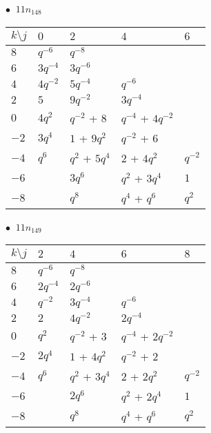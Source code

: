 \begin{minipage}{\linewidth}
$\bullet\ $ $11n_{148}$ \vspace{0.5em} \\
\begin{tabular}{l|llll}
$k \setminus j$ & $0$ & $2$ & $4$ & $6$ \\
\hline
$8$ & $q^{-6}$ & $q^{-8}$ &  &  \\
$6$ & $3q^{-4}$ & $3q^{-6}$ &  &  \\
$4$ & $4q^{-2}$ & $5q^{-4}$ & $q^{-6}$ &  \\
$2$ & $5$ & $9q^{-2}$ & $3q^{-4}$ &  \\
$0$ & $4q^{2}$ & $q^{-2}$ + $8$ & $q^{-4}$ + $4q^{-2}$ &  \\
$-2$ & $3q^{4}$ & $1$ + $9q^{2}$ & $q^{-2}$ + $6$ &  \\
$-4$ & $q^{6}$ & $q^{2}$ + $5q^{4}$ & $2$ + $4q^{2}$ & $q^{-2}$ \\
$-6$ &  & $3q^{6}$ & $q^{2}$ + $3q^{4}$ & $1$ \\
$-8$ &  & $q^{8}$ & $q^{4}$ + $q^{6}$ & $q^{2}$ \\
\end{tabular}
\vspace{2em}
\end{minipage}
%
\begin{minipage}{\linewidth}
$\bullet\ $ $11n_{149}$ \vspace{0.5em} \\
\begin{tabular}{l|llll}
$k \setminus j$ & $2$ & $4$ & $6$ & $8$ \\
\hline
$8$ & $q^{-6}$ & $q^{-8}$ &  &  \\
$6$ & $2q^{-4}$ & $2q^{-6}$ &  &  \\
$4$ & $q^{-2}$ & $3q^{-4}$ & $q^{-6}$ &  \\
$2$ & $2$ & $4q^{-2}$ & $2q^{-4}$ &  \\
$0$ & $q^{2}$ & $q^{-2}$ + $3$ & $q^{-4}$ + $2q^{-2}$ &  \\
$-2$ & $2q^{4}$ & $1$ + $4q^{2}$ & $q^{-2}$ + $2$ &  \\
$-4$ & $q^{6}$ & $q^{2}$ + $3q^{4}$ & $2$ + $2q^{2}$ & $q^{-2}$ \\
$-6$ &  & $2q^{6}$ & $q^{2}$ + $2q^{4}$ & $1$ \\
$-8$ &  & $q^{8}$ & $q^{4}$ + $q^{6}$ & $q^{2}$ \\
\end{tabular}
\vspace{2em}
\end{minipage}

